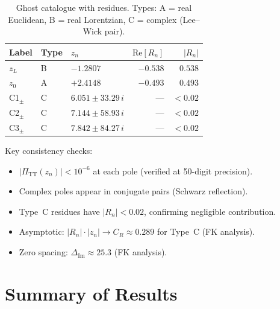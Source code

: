 \documentclass[11pt,a4paper]{article}
\newcommand{\PiTT}{\Pi_{\mathrm{TT}}}
\newcommand{\Imag}{\mathrm{Im}}
\newcommand{\Real}{\mathrm{Re}}
\begin{document}
\begin{table}[htbp]
\centering
\caption{Ghost catalogue with residues. Types: A = real Euclidean,
B = real Lorentzian, C = complex (Lee--Wick pair).}
\label{tab:ghost-catalogue}
\begin{tabular}{@{}lllrr@{}}
\toprule
Label & Type & $z_n$ & $\Real[R_n]$ & $|R_n|$ \\
\midrule
$z_L$ & B & $-1.2807$ & $-0.538$ & $0.538$ \\
$z_0$ & A & $+2.4148$ & $-0.493$ & $0.493$ \\
C1$_\pm$ & C & $6.051 \pm 33.29\,i$ & --- & $< 0.02$ \\
C2$_\pm$ & C & $7.144 \pm 58.93\,i$ & --- & $< 0.02$ \\
C3$_\pm$ & C & $7.842 \pm 84.27\,i$ & --- & $< 0.02$ \\
\bottomrule
\end{tabular}
\end{table}

Key consistency checks:
\begin{itemize}[nosep]
  \item $|\PiTT(z_n)| < 10^{-6}$ at each pole (verified at 50-digit precision).
  \item Complex poles appear in conjugate pairs (Schwarz reflection).
  \item Type~C residues have $|R_n| < 0.02$, confirming negligible contribution.
  \item Asymptotic: $|R_n|\cdot|z_n| \to C_R \approx 0.289$ for Type~C (FK analysis).
  \item Zero spacing: $\Delta_{\Imag} \approx 25.3$ (FK analysis).
\end{itemize}

\section{Summary of Results}
\label{sec:summary}
\end{document}
